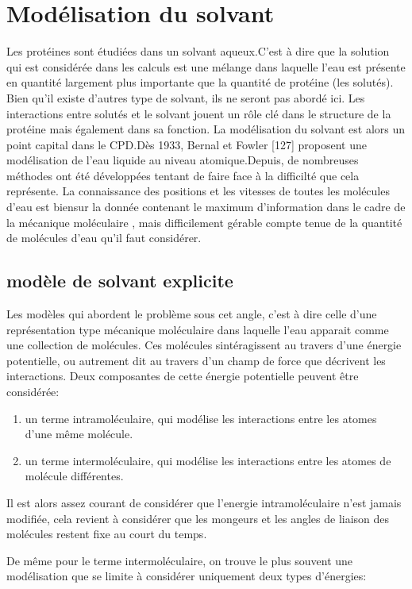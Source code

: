 \section{Modélisation du solvant}
Les protéines sont étudiées dans un solvant aqueux.C'est à dire que la solution qui est considérée dans les calculs est une mélange dans laquelle l'eau est présente en quantité largement plus importante que la quantité de protéine (les solutés). Bien qu'il existe d'autres type de solvant, ils ne seront pas abordé ici. Les interactions entre solutés et le solvant jouent un  rôle clé dans le structure de la protéine mais également dans sa fonction. La modélisation du solvant est alors un point capital dans le CPD.Dès 1933, Bernal et Fowler [127] proposent une modélisation de l'eau liquide au niveau atomique.Depuis, de nombreuses méthodes ont été développées tentant de faire face à la difficilté que cela représente. La connaissance des positions et les vitesses de toutes les molécules d'eau est biensur la donnée contenant le maximum d'information dans le cadre de la mécanique moléculaire , mais difficilement gérable compte tenue de la quantité de molécules d'eau qu'il faut considérer.

\subsection{modèle de solvant explicite}

Les modèles qui abordent le problème sous cet angle, c'est à dire celle d'une représentation type mécanique moléculaire dans laquelle l'eau apparait comme une collection de molécules. Ces molécules sintéragissent au travers d'une énergie potentielle, ou autrement dit au travers d'un champ de force que décrivent les interactions.
Deux composantes de cette énergie potentielle peuvent être considérée:
\begin{enumerate}
\item un terme intramoléculaire, qui modélise les interactions entre les atomes d'une même molécule.
\item un terme intermoléculaire, qui modélise les interactions entre les atomes de molécule différentes.
\end{enumerate}

Il est alors assez courant de considérer que l'energie intramoléculaire n'est jamais modifiée, cela revient à considérer que les mongeurs et les angles de liaison des molécules restent fixe au court du temps.

De même pour le terme intermoléculaire, on trouve le plus souvent une modélisation que se limite à considérer uniquement deux types d'énergies:

